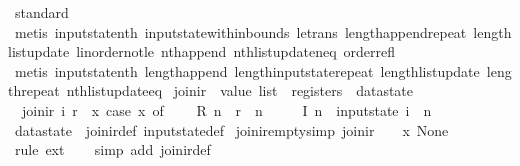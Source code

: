 \begin{isabellebody}
\ standard\isanewline
\ \ \isamarkupfalse%
\ {\isacharparenleft}metis\ input{}state{\isacharunderscore}nth\ input{}state{\isacharunderscore}within{\isacharunderscore}bounds\ le{\isacharunderscore}trans\ length{\isacharunderscore}append{\isacharunderscore}repeat\ length{\isacharunderscore}list{\isacharunderscore}update\ linorder{\isacharunderscore}not{\isacharunderscore}le\ nth{\isacharunderscore}append\ nth{\isacharunderscore}list{\isacharunderscore}update{\isacharunderscore}neq\ order{\isacharunderscore}refl{\isacharparenright}\isanewline
\ \ \isamarkupfalse%
\ {\isacharparenleft}metis\ input{}state{\isacharunderscore}nth\ length{\isacharunderscore}append\ length{\isacharunderscore}input{}state{\isacharunderscore}repeat\ length{\isacharunderscore}list{\isacharunderscore}update\ length{\isacharunderscore}repeat\ nth{\isacharunderscore}list{\isacharunderscore}update{\isacharunderscore}eq{\isacharparenright}%
\endisatagproof
{\isafoldproof}%
%
\isadelimproof
\isanewline
%
\endisadelimproof
\isanewline
{}\isamarkupfalse%
\ join{\isacharunderscore}ir\ {\isacharcolon}{\isacharcolon}\ {\isachardoublequoteopen}value\ list\ {\isasymRightarrow}\ registers\ {\isasymRightarrow}\ datastate{\isachardoublequoteclose}\ \isanewline
\ \ {\isachardoublequoteopen}join{\isacharunderscore}ir\ i\ r\ {\isasymequiv}\ {\isacharparenleft}{\isasymlambda}x{\isachardot}\ case\ x\ of\isanewline
\ \ \ \ R\ n\ {\isasymRightarrow}\ r\ {\isachardollar}\ n\ {\isacharbar}\isanewline
\ \ \ \ I\ n\ {\isasymRightarrow}\ {\isacharparenleft}input{}state\ i{\isacharparenright}\ {\isachardollar}\ n\isanewline
\ \ {\isacharparenright}{\isachardoublequoteclose}\isanewline
\isanewline
{}\isamarkupfalse%
\ datastate\ {\isacharequal}\ join{\isacharunderscore}ir{\isacharunderscore}def\ input{}state{\isacharunderscore}def\isanewline
\isanewline
{}\isamarkupfalse%
\ join{\isacharunderscore}ir{\isacharunderscore}empty{\isacharbrackleft}simp{\isacharbrackright}{\isacharcolon}\ {\isachardoublequoteopen}join{\isacharunderscore}ir\ {\isacharbrackleft}{\isacharbrackright}\ {\isacharless}{\isachargreater}\ {\isacharequal}\ {\isacharparenleft}{\isasymlambda}x{\isachardot}\ None{\isacharparenright}{\isachardoublequoteclose}\isanewline
%
\isadelimproof
\ \ %
\endisadelimproof
%
\isatagproof
{}\isamarkupfalse%
\ {\isacharparenleft}rule\ ext{\isacharparenright}\isanewline
\ \ \isamarkupfalse%
\ {\isacharparenleft}simp\ add{\isacharcolon}\ join{\isacharunderscore}ir{\isacharunderscore}def{\isacharparenright}\isanewline

\end{isabellebody}
